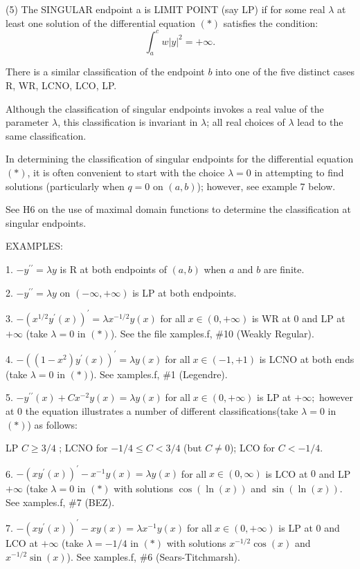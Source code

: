 \documentclass[12pt]{amsart}%
\theoremstyle{plain}
\numberwithin{equation}{section}
\numberwithin{theorem}{section}
\begin{document}
(5) The SINGULAR endpoint a is LIMIT POINT (say LP) if for some real $\lambda$
at least one solution of the differential equation $(\ast)$ satisfies the
condition:%
\[
\int_{a}^{c}w\left|  y\right|  ^{2}=+\infty.
\]

There is a similar classification of the endpoint $b$ into one of the five
distinct cases R, WR, LCNO, LCO, LP.

Although the classification of singular endpoints invokes a real value of the
parameter $\lambda$, this classification is invariant in $\lambda$; all real
choices of $\lambda$ lead to the same classification.

In determining the classification of singular endpoints for the differential
equation $(\ast)$, it is often convenient to start with the choice $\lambda=0$
in attempting to find solutions (particularly when $q=0$ on $(a,b)$); however,
see example 7 below.

See H6 on the use of maximal domain functions to determine the classification
at singular endpoints.

EXAMPLES:

1. $-y^{\prime\prime}=\lambda y$ is R at both endpoints of $(a,b)$ when $a$
and $b$ are finite.

2. $-y^{\prime\prime}=\lambda y$ on $(-\infty,+\infty)$ is LP at both endpoints.

3. $-\left(  x^{1/2}y^{\prime}(x)\right)  ^{\prime}=\lambda x^{-1/2}y(x)$ for
all$\;x\in(0,+\infty)$ is WR at $0$ and LP at $+\infty$ (take $\lambda=0$ in
$(\ast)$). See the file xamples.f, \#10 (Weakly Regular).

4. $-((1-x^{2})y^{\prime}(x))^{\prime}=\lambda y(x)\;$for all$\;x\in(-1,+1)$
is LCNO at both ends (take $\lambda=0$ in $(\ast)$). See xamples.f, \#1 (Legendre).

5. $-y^{\prime\prime}(x)+Cx^{-2}y(x)=\lambda y(x)\;$for all$\;x\in(0,+\infty)$
is LP at $+\infty;$ however at $0$ the equation illustrates a number of
different classifications(take $\lambda=0$ in $(\ast)$) as follows:

LP $C\geq3/4$ ; LCNO for $-1/4\leq C<3/4$ (but $C\neq0$); LCO for $C<-1/4.$

6. $-(xy^{\prime}(x))^{\prime}-x^{-1}y(x)=\lambda y(x)\;$for all$\;x\in
(0,\infty)$ is LCO at $0$ and LP $+\infty$ (take $\lambda=0$ in $(\ast)$ with
solutions $\cos(\ln(x))$ and $\sin(\ln(x))$. See xamples.f, \#7 (BEZ).

7. $-(xy^{\prime}(x))^{\prime}-xy(x)=\lambda x^{-1}y(x)\;$for all$\;x\in
(0,+\infty)$ is LP at $0$ and LCO at $+\infty$ (take $\lambda=-1/4$ in
$(\ast)$ with solutions $x^{-1/2}\cos(x)$ and $x^{-1/2}\sin(x)$). See
xamples.f, \#6 (Sears-Titchmarsh).
\end{document}
